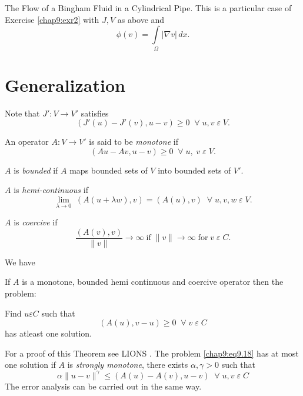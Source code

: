 \begin{exam}\label{chap9:exm4}
{The Flow of a Bingham Fluid in a Cylindrical Pipe.} This is a
particular case of Exercise \ref{chap9:exr2} with $J,V$ as above and 
$$
\phi(v)=\int\limits_\Omega |\nabla v|\,dx.
$$
\end{exam}

\setcounter{section}{1}
\section{Generalization}\label{chap9:sec2} 
Note that $J':V\to V'$ satisfies 
$$
(J'(u)-J'(v),u-v)\geq 0\; \; \forall \;u,v \;\varepsilon \;V.
$$\pageoriginale

An operator $A:V\to V'$ is said to be \emph{monotone} if 
\begin{equation}\label{chap9:eq9.15}
(Au-Av, u-v)\geq 0\; \; \forall \;u, \;v \;\varepsilon \;V.
\end{equation}

$A$ is \emph{bounded} if $A$ maps bounded sets of $V$ into bounded
sets of $V'$. 

$A$ is \emph{hemi-continuous} if 
\begin{equation}\label{chap9:eq9.16}
\lim\limits_{\lambda\to 0}\;(A(u+\lambda w),v)=(A(u),v)\; \; \forall \;u,
v, w\;\varepsilon \;V.
\end{equation}

$A$ is \emph{coercive} if 
\begin{equation}\label{chap9:eq9.17}
\frac{(A(v),v)}{\parallel v\parallel}\to \infty \;\text{if}\;
\parallel v\parallel \to \infty \;\text{for}\; v\;\varepsilon \;C.
\end{equation}

We have 
\begin{THM}\label{chap9:THM2}
If $A$ is a monotone, bounded hemi continuous and coercive operator
then the problem:

Find $u\varepsilon C$ such that 
\begin{equation}\label{chap9:eq9.18}
(A(u),v-u)\geq 0\; \; \forall \;v \;\varepsilon \;C
\end{equation}
has atleast one solution.
\end{THM}

For a proof of this Theorem see LIONS \cite{key28}. The problem
\eqref{chap9:eq9.18} has at most one solution if $A$ is \emph{strongly
  monotone}, \ie there exists $\alpha,\gamma >0$ such that
\begin{equation}\label{chap9:eq9.19}
\alpha\parallel u-v\parallel^\gamma\leq(A(u)-A(v),u-v)\; \; \forall \;u,v
\;\varepsilon \;C
\end{equation}
The error analysis can be carried out in the same way. 

